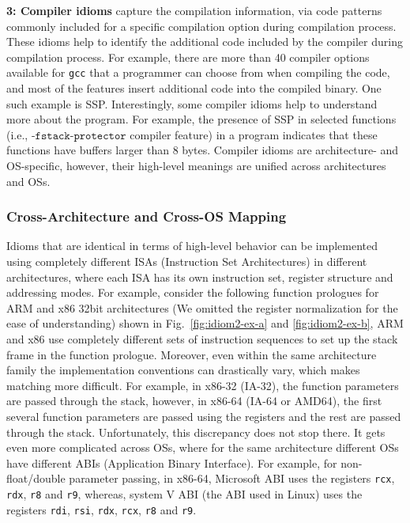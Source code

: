 \noindent \textbf{3: Compiler idioms} capture the compilation information, via code patterns  commonly  included for a specific compilation option during compilation process.
These idioms help to identify the additional code included by the compiler during compilation process. For example, there are more than 40 compiler options available for \texttt{gcc} that a programmer can choose from when compiling the code, and most of the features insert additional code into the compiled binary. One such example is SSP. Interestingly, some compiler idioms help to understand more about the program. For example, the presence of SSP in selected functions (i.e., -$\mathtt{fstack}$-$\mathtt{protector}$ compiler feature) in a program indicates that these  functions have buffers larger than 8 bytes. Compiler idioms are architecture- and OS-specific, however, their high-level meanings are unified across architectures and OSs.

\subsubsection{Cross-Architecture and Cross-OS Mapping} \label{subsubsec:archi_plat_dep}
Idioms that are identical in terms of high-level behavior can be implemented using completely different ISAs (Instruction Set Architectures) in different architectures, where each ISA has its own instruction set, register structure and addressing modes. For example, consider the following function prologues for ARM and x86 32bit architectures (We omitted the register normalization for the ease of understanding) shown in Fig.~\ref{fig:idiom2-ex-a} and \ref{fig:idiom2-ex-b}, ARM and x86 use completely different sets of instruction sequences to set up the stack frame in the function prologue. Moreover, even within the same architecture family the implementation conventions can drastically vary, which makes matching more difficult. For example, in x86-32 (IA-32), the function parameters are passed through the stack, however, in x86-64 (IA-64 or AMD64), the first several function parameters are passed using the registers and the rest are passed through the stack. Unfortunately, this discrepancy does not stop there. It gets even more complicated across OSs, where for the same architecture different OSs have different ABIs (Application Binary Interface). For example, for non-float/double parameter passing, in x86-64, Microsoft ABI uses the registers \texttt{rcx}, \texttt{rdx}, \texttt{r8} and \texttt{r9}, whereas, system V ABI (the ABI used in Linux) uses the registers \texttt{rdi}, \texttt{rsi}, \texttt{rdx}, \texttt{rcx}, \texttt{r8} and \texttt{r9}.

